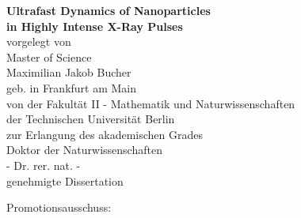 %
\begin{fullsizetitle}
\vspace{40mm}
\begin{center}
%
{\LARGE \textbf{Ultrafast Dynamics of Nanoparticles\\in Highly Intense X-Ray Pulses\vspace{20mm}\\}}%
{\large%
vorgelegt von
\vspace{4mm}\\
Master of Science}%
\vspace{2mm}\\
%
{\Large Maximilian Jakob Bucher}
\vspace{4mm}\\
%
{\large geb. in Frankfurt am Main} %
\vspace{20mm}
\\
%
{\large %
von der Fakultät II - Mathematik und Naturwissenschaften
\vspace{1mm}\\
der Technischen Universität Berlin
\vspace{1mm}\\
zur Erlangung des akademischen Grades
%
\vspace{7.5mm}
\\
%
Doktor der Naturwissenschaften
\vspace{1mm}\\
- Dr. rer. nat. -
%
\vspace{7.5mm}
\\
%
%
genehmigte Dissertation
%
\vspace{10mm}}
\\
\end{center}
%
{\large%
\hspace{22mm}Promotionsausschuss:
%
%
\begin{tabbing}

\end{tabbing}}
\end{fullsizetitle}

